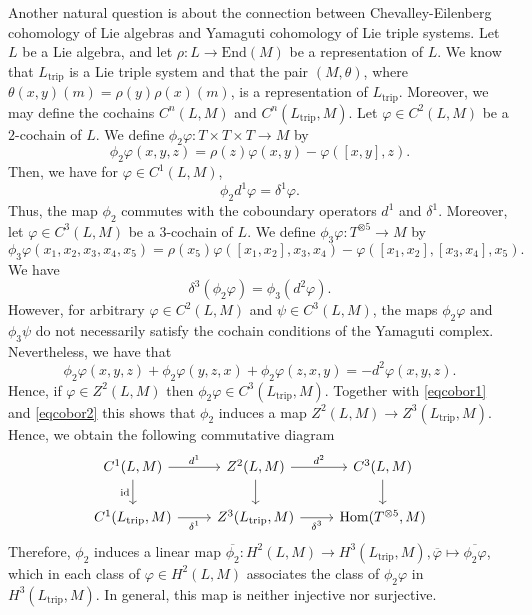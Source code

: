 \documentclass[11pt, twoside]{article}
\begin{document}
Another natural question is about the connection between  Chevalley-Eilenberg cohomology of Lie algebras and  Yamaguti cohomology of Lie triple systems. Let $L$ be a Lie algebra, and let $\rho:L\to \mathrm{End}(M)$ be a representation of $L$. We know that $L_\mathrm{trip} $ is a Lie triple system and that the pair $(M,\theta) $, where $\theta(x,y)(m)=\rho(y)\rho(x)(m) $, is a representation of $L_\mathrm{trip} $. Moreover,  we may define the cochains $C^n(L,M) $ and $C^n(L_\mathrm{trip},M) $. Let $\varphi\in C^2(L,M) $ be a $2$-cochain of $L$. We define $\phi_2{\varphi}:T\times T\times T\to M $ by \begin{equation}\label{eqtilde}
    \phi_2\varphi(x,y,z)=\rho(z)\varphi(x,y)-\varphi([x,y],z).
\end{equation}  Then, we have  for $\varphi\in C^1(L,M)$, \begin{equation}\label{eqcobor1}
    \phi_2d^1\varphi=\delta^1\varphi.
\end{equation}  Thus, the map $\phi_2$ commutes with the coboundary operators $d^1$ and $\delta^1 $. Moreover, let $\varphi\in C^3(L,M) $ be a $3$-cochain of $L$. We define $\phi_3{\varphi}:T^{\otimes 5}\to M $ by $$\phi_3\varphi(x_1,x_2,x_3,x_4,x_5)= \rho(x_5)\varphi([x_1,x_2],x_3,x_4)- \varphi([x_1,x_2],[x_3,x_4],x_5 ). $$ We have  \begin{equation}\label{eqcobor2}
    \delta^3(\phi_2{\varphi})=\phi_3({d^2\varphi}).
\end{equation}  However, for arbitrary $\varphi\in C^2(L,M)$ and $\psi\in C^3(L,M)$, the maps $\phi_2\varphi$ and $\phi_3\psi$ do not necessarily satisfy the cochain conditions of the Yamaguti complex. Nevertheless, we have that $$\phi_2{\varphi}(x,y,z)+\phi_2{\varphi}(y,z,x)+\phi_2{\varphi}(z,x,y)=-d^2\varphi(x,y,z). $$ Hence, if $\varphi\in Z^2(L,M) $ then $\phi_2\varphi\in C^3(L_\mathrm{trip},M) $. Together with \eqref{eqcobor1} and \eqref{eqcobor2} this shows that $\phi_2$ induces a map $Z^2(L,M)\to Z^3(L_\mathrm{trip},M) $. Hence, we obtain the following commutative diagram \[\begin{tikzcd}
	{C^1(L,M)} & {Z^2(L,M)} & {C^3(L,M)} \\
	{C^1(L_\mathrm{trip},M)} & {Z^3(L_\mathrm{trip},M)} & {\mathrm{Hom}(T^{\otimes 5},M)}
	\arrow["{d^1}", from=1-1, to=1-2]
	\arrow["{\mathrm{id}}"', from=1-1, to=2-1]
	\arrow["{d^2}", from=1-2, to=1-3]
	\arrow[from=1-2, to=2-2]
	\arrow[from=1-3, to=2-3]
	\arrow["{\delta^1}"', from=2-1, to=2-2]
	\arrow["{\delta^3}"', from=2-2, to=2-3]
\end{tikzcd}\] Therefore, $\phi_2$ induces a linear map $\overline{\phi_2}:H^2(L,M)\to H^3(L_\mathrm{trip},M),\overline{\varphi}\mapsto\overline{\phi_2{\varphi}} $, which in each class of $\varphi\in H^2(L,M)$ associates the class of $\phi_2{\varphi}$ in $H^3(L_\mathrm{trip},M)$. In general, this map is neither injective nor surjective.
\end{document}
